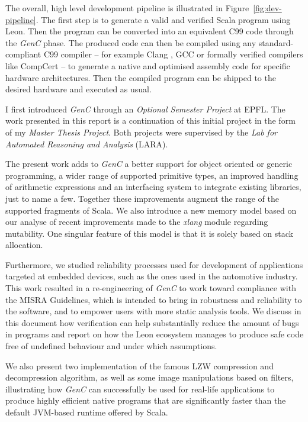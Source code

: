 \documentclass[a4paper,twoside]{article}
\newcommand{\GenC}{\emph{GenC}\xspace}
\newcommand{\RefFig}[1]{Figure~\ref{#1}}
\begin{document}
The overall, high level development pipeline is illustrated in
\RefFig{fig:dev-pipeline}. The first step is to generate a valid and verified
Scala program using Leon. Then the program can be converted into an equivalent
C99 code through the \GenC phase.  The produced code can then be compiled using
any standard-compliant C99 compiler -- for example Clang \cite{clang}, GCC
\cite{gcc} or formally verified compilers like CompCert \cite{Leroy-backend}
\cite{compcert} -- to generate a native and optimised assembly code for specific
hardware architectures. Then the compiled program can be shipped to the desired
hardware and executed as usual.

I first introduced \GenC through an \emph{Optional Semester Project} at EPFL.
The work presented in this report is a continuation of this initial project in
the form of my \emph{Master Thesis Project}. Both projects were supervised by
the \emph{Lab for Automated Reasoning and Analysis} (LARA).

The present work adds to \GenC a better support for object oriented or generic
programming, a wider range of supported primitive types, an improved handling of
arithmetic expressions and an interfacing system to integrate existing
libraries, just to name a few. Together these improvements augment the range of
the supported fragments of Scala. We also introduce a new memory model based on
our analyse of recent improvements made to the \emph{xlang} module
\cite{Blanc:2013:OLV:2489837.2489838} \cite{xlang} regarding mutability. One
singular feature of this model is that it is solely based on stack allocation.

Furthermore, we studied reliability processes used for development of
applications targeted at embedded devices, such as the ones used in the
automotive industry. This work resulted in a re-engineering of \GenC to work
toward compliance with the MISRA Guidelines, which is intended to bring in
robustness and reliability to the software, and to empower users with more
static analysis tools. We discuss in this document how verification can help
substantially reduce the amount of bugs in programs and report on how the Leon
ecosystem manages to produce safe code free of undefined behaviour and under
which assumptions.

We also present two implementation of the famous LZW \cite{welch1985high}
compression and decompression algorithm, as well as some image manipulations
based on filters, illustrating how \GenC can successfully be used for real-life
applications to produce highly efficient native programs that are significantly
faster than the default JVM-based runtime offered by Scala.
\end{document}
